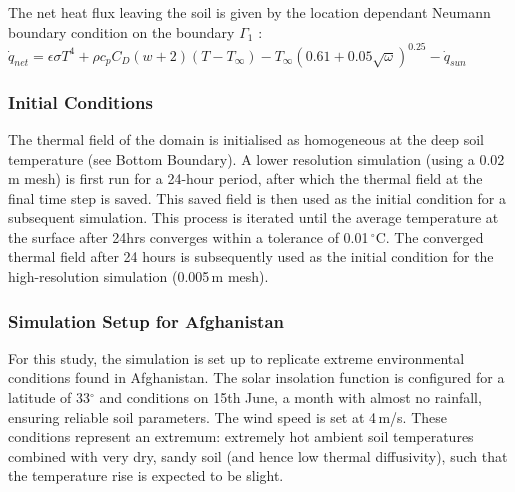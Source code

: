     The net heat flux leaving the soil is given by the location dependant Neumann boundary condition on the boundary $\Gamma_1$ : $\dot{q}_{net} = \epsilon \sigma T^4+ \rho c_p C_D(w+2)(T - T_{\infty}) - T_{\infty} \left( 0.61 + 0.05 \sqrt{\omega} \right)^{0.25}  - \dot{q}_{sun}$

    \subsubsection{Initial Conditions}
    The thermal field of the domain is initialised as homogeneous at the deep soil temperature (see Bottom Boundary). A lower resolution simulation (using a 0.02\,m mesh) is first run for a 24-hour period, after which the thermal field at the final time step is saved. This saved field is then used as the initial condition for a subsequent simulation. This process is iterated until the average temperature at the surface after 24hrs converges within a tolerance of 0.01\,\(^\circ\)C. The converged thermal field after 24 hours is subsequently used as the initial condition for the high-resolution simulation (0.005\,m mesh).

    \subsubsection{Simulation Setup for Afghanistan}
    For this study, the simulation is set up to replicate extreme environmental conditions found in Afghanistan. The solar insolation function is configured for a latitude of 33\(^\circ\) and conditions on 15th June, a month with almost no rainfall, ensuring reliable soil parameters. The wind speed is set at 4\,m/s. These conditions represent an extremum: extremely hot ambient soil temperatures combined with very dry, sandy soil (and hence low thermal diffusivity), such that the temperature rise is expected to be slight.

